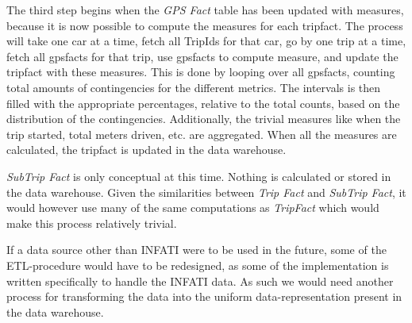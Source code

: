 The third step begins when the \textit{GPS Fact} table has been updated with measures, because it is now possible to compute the measures for each tripfact. The process will take one car at a time, fetch all TripIds for that car, go by one trip at a time, fetch all gpsfacts for that trip, use gpsfacts to compute measure, and update the tripfact with these measures. This is done by looping over all gpsfacts, counting total amounts of contingencies for the different metrics. The intervals is then filled with the appropriate percentages, relative to the total counts, based on the distribution of the contingencies. Additionally, the trivial measures like when the trip started, total meters driven, etc. are aggregated. When all the measures are calculated, the tripfact is updated in the data warehouse.

\textit{SubTrip Fact} is only conceptual at this time. Nothing is calculated or stored in the data warehouse. Given the similarities between \textit{Trip Fact} and \textit{SubTrip Fact}, it would however use many of the same computations as \textit{TripFact} which would make this process relatively trivial.

If a data source other than INFATI were to be used in the future, some of the ETL-procedure would have to be redesigned, as some of the implementation is written specifically to handle the INFATI data. As such we would need another process for transforming the data into the uniform data-representation present in the data warehouse.

